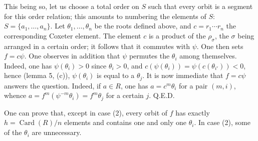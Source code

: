 This being so, let us
choose a total order
on $S$ such that every
orbit is a segment
for this order relation;
this amounts to numbering
the elements of $S$:
$S=\{a_1,\ldots,a_n\}$.
Let $\theta_1,\ldots,\theta_n$
be the roots defined
above, and
$c=r_1\cdots r_n$
the corresponding
Coxeter element.
The element $c$ is
a product of the
$\rho_\sigma$, the
$\sigma$ being arranged
in a certain order;
it follows that it
commutes with $\psi$.
One then sets $f=c\psi$.
One observes in
addition that $\psi$
permutes the $\theta_i$
among themselves.
Indeed, one has
$\psi(\theta_i)>0$
since $\theta_i>0$,
and
$c(\psi(\theta_i))=\psi(c(\theta_{i'}))<0$,
hence (lemma 5, (c)),
$\psi(\theta_i)$ is
equal to a $\theta_j$.
It is now immediate
that $f=c\psi$
answers the question.
Indeed, if $a\in R$,
one has $a=c^m\theta_i$
for a pair $(m,i)$,
whence
$a=f^m(\psi^{-m}\theta_i)=f^m\theta_j$
for a certain $j$.
\hfill Q.E.D.

\begin{remark*}
One can prove that,
except in case (2),
every orbit of $f$
has exactly
$h=\operatorname{Card}(R)/n$
elements and contains
one and only one
$\theta_i$. In case
(2), some of the
$\theta_i$ are
unnecessary.
\end{remark*}

